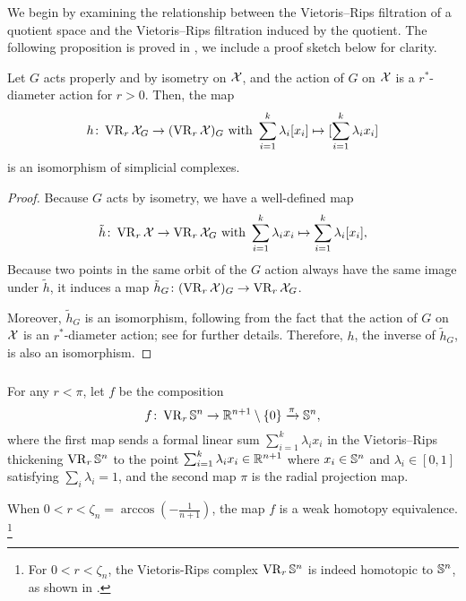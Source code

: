 \subsubsection{}\label{subsub:h}

We begin by examining the relationship between the Vietoris--Rips filtration of a quotient space and the Vietoris--Rips filtration induced by the quotient.
The following proposition is proved in \cite[Proposition 3.5]{adams2022metric}, we include a proof sketch below for clarity.

\medskip\lemma
Let $G$ acts properly and by isometry on $\mathcal{X}$, and the action of $G$ on $\mathcal{X}$ is a $r^*$-diameter action for $r>0$. Then, the map
\[
h \colon \operatorname{VR}_r\mathcal{X}_G \to (\operatorname{VR}_r\mathcal{X})_G
\text{ with }
\sum_{i=1}^k \lambda_i [x_i] \mapsto [\sum_{i=1}^k \lambda_i x_i]
\]
is an isomorphism of simplicial complexes.

\begin{proof}
	Because $G$ acts by isometry, we have a well-defined map
	\[
	\tilde{h} \colon \operatorname{VR}_r\mathcal{X} \to \operatorname{VR}_r\mathcal{X}_G
	\text{ with }
	\sum_{i=1}^k \lambda_i x_i \mapsto \sum_{i=1}^k \lambda_i [x_i],
	\]
	Because two points in the same orbit of the $G$ action always have the same image under $\tilde{h}$, it induces a map $\tilde{h}_G \colon (\operatorname{VR}_r\mathcal{X})_G \to \operatorname{VR}_r\mathcal{X}_G$.

	Moreover, $\tilde{h}_G$ is an isomorphism, following from the fact that the action of $G$ on $\mathcal{X}$ is an $r^*$-diameter action; see \cite[Proposition 3.5]{adams2022metric} for further details.
	Therefore, $h$, the inverse of $\tilde{h}_G$, is also an isomorphism.
\end{proof}

\subsubsection{}
\label{subsub:f}

For any $r<\pi$, let $f$ be the composition
\[
f \colon \operatorname{VR}_r\mathbb{S}^n \to \mathbb{R}^{n+1} \setminus \{0\} \xrightarrow{\pi} \mathbb{S}^n,
\]
where the first map sends a formal linear sum $\sum_{i=1}^k \lambda_i x_i$ in the Vietoris--Rips thickening $\operatorname{VR}_r\mathbb{S}^n$ to the point $\sum_{i=1}^k \lambda_i x_i \in \mathbb{R}^{n+1}$ where $x_i \in \mathbb{S}^n$ and $\lambda_i \in [0,1]$ satisfying $\sum_i\lambda_i=1$, and the second map $\pi$ is the radial projection map.

\medskip\lemma
When $0<r<\zeta_n=\arccos{(-\tfrac{1}{n+1})}$, the map $f$ is a weak homotopy equivalence.
\footnote{For $0<r<\zeta_n$, the Vietoris-Rips complex $\operatorname{VR}_r\mathbb{S}^n$ is indeed homotopic to $\mathbb{S}^n$, as shown in \cite[Theorem 7.1]{lim2020vietoris}.}

